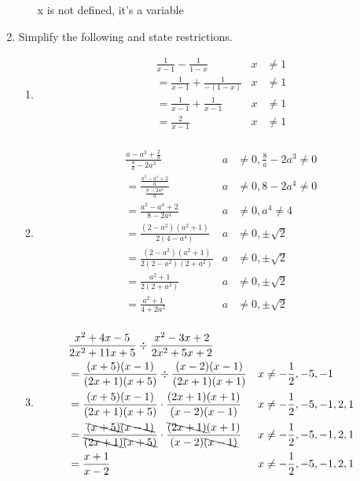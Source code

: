 \documentclass[paper=a4, fontsize=11pt]{scrartcl}
\begin{document}
\begin{enumerate}
\begin{enumerate}
        x is not defined, it's a variable
    \end{enumerate}
    \item Simplify the following and state restrictions.
    \begin{enumerate}
        \item \begin{align*}
            &\frac{1}{x-1}-\frac{1}{1-x}&x&\neq 1\\
            &=\frac{1}{x-1}+\frac{1}{-(1-x)}&x&\neq 1\\
            &=\frac{1}{x-1}+\frac{1}{x-1}&x&\neq 1\\
            &=\frac{2}{x-1}&x&\neq 1 \\
        \end{align*}
        \item \begin{align*}
            &\frac{a-a^3+\frac{2}{a}}{\frac{8}{a}-2a^3}&a&\neq 0,\frac{8}{a}-2a^3\neq 0\\
            &=\frac{\frac{a^2-a^4+2}{a}}{\frac{8-2a^4}{a}}&a&\neq 0,8-2a^4 \neq 0\\
            &=\frac{a^2-a^4+2}{8-2a^4}&a&\neq 0,a^4\neq 4\\
            &=\frac{(2-a^2)(a^2+1)}{2(4-a^4)}&a&\neq 0,\pm \sqrt{2}\\
            &=\frac{(2-a^2)(a^2+1)}{2(2-a^2)(2+a^2)}&a&\neq 0,\pm \sqrt{2}\\
            &=\frac{a^2+1}{2(2+a^2)}&a&\neq 0,\pm \sqrt{2}\\
            &=\frac{a^2+1}{4+2a^2}&a&\neq 0,\pm \sqrt{2}\\
        \end{align*}
        \item \begin{align*}
            &\frac{x^2+4x-5}{2x^2+11x+5}\div\frac{x^2-3x+2}{2x^2+5x+2}\\
            &=\frac{(x+5)(x-1)}{(2x+1)(x+5)}\div\frac{(x-2)(x-1)}{(2x+1)(x+1)}&x&\neq-\frac{1}{2},-5,-1\\
            &=\frac{(x+5)(x-1)}{(2x+1)(x+5)}\cdot \frac{(2x+1)(x+1)}{(x-2)(x-1)}&x&\neq-\frac{1}{2},-5,-1,2,1\\
            &=\frac{\bcancel{(x+5)}\bcancel{(x-1)}}{\bcancel{(2x+1)}\bcancel{(x+5)}}\cdot \frac{\bcancel{(2x+1)}(x+1)}{(x-2)\bcancel{(x-1)}}&x&\neq-\frac{1}{2},-5,-1,2,1\\
            &=\frac{x+1}{x-2}&x&\neq-\frac{1}{2},-5,-1,2,1\\
        \end{align*}

\end{enumerate}
\end{enumerate}
\end{document}
